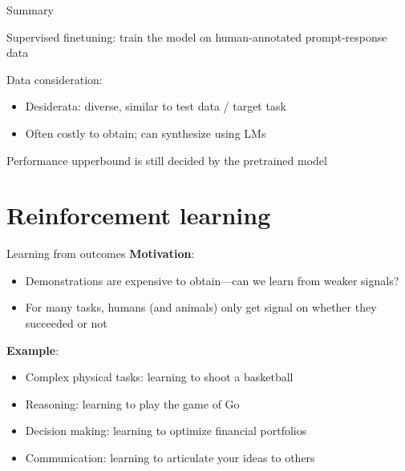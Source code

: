 \documentclass[usenames,dvipsnames,notes,11pt,aspectratio=169,hyperref={colorlinks=true, linkcolor=blue}]{beamer}
\begin{document}

\begin{frame}
    {Summary}
    \begin{wideitemize}
        \item {Supervised finetuning}: train the model on human-annotated prompt-response data 
        \item Data consideration:
            \begin{itemize}
                \item Desiderata: diverse, similar to test data / target task
                \item Often costly to obtain; can synthesize using LMs
            \end{itemize}
        \item Performance upperbound is still decided by the pretrained model
    \end{wideitemize}
\end{frame}

\section{Reinforcement learning}

\begin{frame}
    {Learning from outcomes}
        \textbf{Motivation}:\\
            \begin{itemize}
                \item Demonstrations are expensive to obtain---can we learn from weaker signals?
                \item For many tasks, humans (and animals) only get signal on whether they succeeded or not 
            \end{itemize}

        \textbf{Example}:\\
            \begin{itemize}
                \item Complex physical tasks: learning to shoot a basketball 
                \item Reasoning: learning to play the game of Go 
                \item Decision making: learning to optimize financial portfolios
                \item Communication: learning to articulate your ideas to others
            \end{itemize}
\end{frame}
\end{document}
